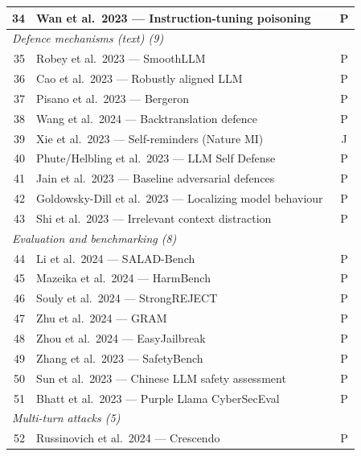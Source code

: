 \begin{longtable}{rp{12.0cm}c}
    34 & Wan et al.\ 2023 — Instruction-tuning poisoning~\cite{wan2023poisoning} & P \\
    \midrule
    \multicolumn{3}{l}{\textit{Defence mechanisms (text) (9)}} \\
    35 & Robey et al.\ 2023 — SmoothLLM~\cite{robey2023smoothllm} & P \\
    36 & Cao et al.\ 2023 — Robustly aligned LLM~\cite{cao2023defending} & P \\
    37 & Pisano et al.\ 2023 — Bergeron~\cite{pisano2023bergeron} & P \\
    38 & Wang et al.\ 2024 — Backtranslation defence~\cite{wang2024defending} & P \\
    39 & Xie et al.\ 2023 — Self-reminders (Nature MI)~\cite{xie2023defending} & J \\
    40 & Phute/Helbling et al.\ 2023 — LLM Self Defense~\cite{helbling2023llm} & P \\
    41 & Jain et al.\ 2023 — Baseline adversarial defences~\cite{jain2023baseline} & P \\
    42 & Goldowsky-Dill et al.\ 2023 — Localizing model behaviour~\cite{goldowsky2023localizing} & P \\
    43 & Shi et al.\ 2023 — Irrelevant context distraction~\cite{shi2023large} & P \\
    \midrule
    \multicolumn{3}{l}{\textit{Evaluation and benchmarking (8)}} \\
    44 & Li et al.\ 2024 — SALAD-Bench~\cite{li2024salad} & P \\
    45 & Mazeika et al.\ 2024 — HarmBench~\cite{mazeika2024harmbench} & P \\
    46 & Souly et al.\ 2024 — StrongREJECT~\cite{souly2024strongreject} & P \\
    47 & Zhu et al.\ 2024 — GRAM~\cite{zhu2024gram} & P \\
    48 & Zhou et al.\ 2024 — EasyJailbreak~\cite{zhou2024easyjailbreak} & P \\
    49 & Zhang et al.\ 2023 — SafetyBench~\cite{zhang2023safetybench} & P \\
    50 & Sun et al.\ 2023 — Chinese LLM safety assessment~\cite{sun2023safety} & P \\
    51 & Bhatt et al.\ 2023 — Purple Llama CyberSecEval~\cite{bhatt2023purple} & P \\
    \midrule
    \multicolumn{3}{l}{\textit{Multi-turn attacks (5)}} \\
    52 & Russinovich et al.\ 2024 — Crescendo~\cite{russinovich2024greatescalation} & P \\

\end{longtable}
